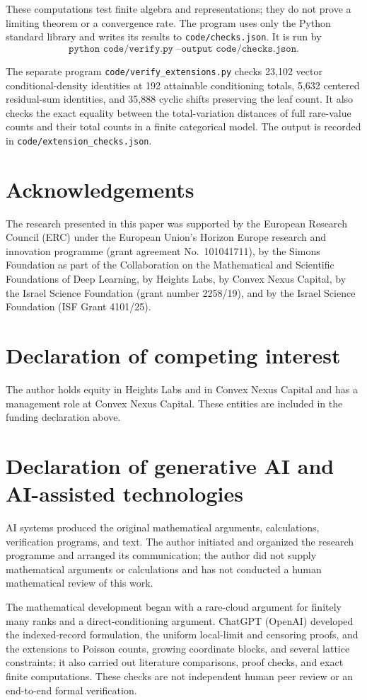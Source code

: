 These computations test finite algebra and representations; they do not prove a limiting theorem or a convergence rate. The program uses only the Python standard library and writes its results to \texttt{code/checks.json}. It is run by
\[
\texttt{python code/verify.py --output code/checks.json}.
\]


The separate program \texttt{code/verify\_extensions.py} checks 23,102 vector conditional-density identities at 192 attainable conditioning totals, 5,632 centered residual-sum identities, and 35,888 cyclic shifts preserving the leaf count. It also checks the exact equality between the total-variation distances of full rare-value counts and their total counts in a finite categorical model. The output is recorded in \texttt{code/extension\_checks.json}.

\section*{Acknowledgements}
The research presented in this paper was supported by the European Research Council (ERC) under the European Union's Horizon Europe research and innovation programme (grant agreement No.~101041711), by the Simons Foundation as part of the Collaboration on the Mathematical and Scientific Foundations of Deep Learning, by Heights Labs, by Convex Nexus Capital, by the Israel Science Foundation (grant number 2258/19), and by the Israel Science Foundation (ISF Grant 4101/25).

\section*{Declaration of competing interest}
The author holds equity in Heights Labs and in Convex Nexus Capital and has a management role at Convex Nexus Capital. These entities are included in the funding declaration above.

\section*{Declaration of generative AI and AI-assisted technologies}
AI systems produced the original mathematical arguments, calculations, verification programs, and text. The author initiated and organized the research programme and arranged its communication; the author did not supply mathematical arguments or calculations and has not conducted a human mathematical review of this work.

The mathematical development began with a rare-cloud argument for finitely many ranks and a direct-conditioning argument. ChatGPT (OpenAI) developed the indexed-record formulation, the uniform local-limit and censoring proofs, and the extensions to Poisson counts, growing coordinate blocks, and several lattice constraints; it also carried out literature comparisons, proof checks, and exact finite computations. These checks are not independent human peer review or an end-to-end formal verification.

